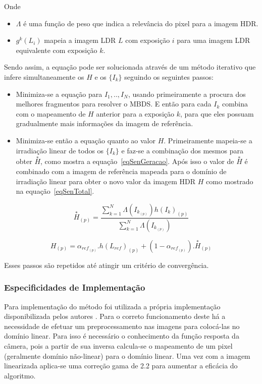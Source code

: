Onde

\begin{itemize}
	\item $\Lambda$ é uma função de peso que indica a relevância do pixel para a imagem HDR.
	\item $g^k(L_i)$ mapeia a imagem LDR $L$ com exposição $i$ para uma imagem LDR equivalente com exposição $k$.
\end{itemize}

Sendo assim, a equação pode ser solucionada através de um método iterativo que infere simultaneamente os $H$ e os $\{I_k\}$ seguindo os seguintes passos:

\begin{itemize}
	\item Minimiza-se a equação para $I_1,..,I_N$, usando primeiramente a procura dos melhores fragmentos para resolver o MBDS. E então para cada $I_k$ combina com o mapeamento de $H$ anterior para a exposição $k$, para que eles possuam gradualmente mais informações da imagem de referência.
	\item Minimiza-se então a equação quanto ao valor $H$. Primeiramente mapeia-se a irradiação linear de todos os $\{I_k\}$ e faz-se a combinação dos mesmos para obter $\overset{*}{H}$, como mostra a equação~\ref{eqSenGeracao}. Após isso o valor de $\overset{*}{H}$ é combinado com a imagem de referência mapeada para o domínio de irradiação linear para obter o novo valor da imagem HDR $H$ como mostrado na equação~\ref{eqSenTotal}.
\end{itemize}

\begin{equation} \label{eqSenGeracao}
	\overset{*}{H}_{(p)} = \frac{\sum\limits_{k = 1}^N{\Lambda(I_{k_{(p)}})h(I_k)_{(p)}}}{\sum\limits_{k = 1}^N{\Lambda(I_{k_{(p)}})}}
\end{equation}

\begin{equation} \label{eqSenTotal}
	H_{(p)} = \alpha_{ref_{(p)}}.h(L_{ref})_{(p)} + (1-\alpha_{ref_{(p)}}).\overset{*}{H}_{(p)}
\end{equation}

Esses passos são repetidos até atingir um critério de convergência.

\subsubsection{Especificidades de Implementação} \label{MetodoSenImplementacao}

Para implementação do método foi utilizada a própria implementação disponibilizada pelos autores \cite{hdrMovimento}. Para o correto funcionamento deste há a necessidade de efetuar um preprocessamento nas imagens para colocá-las no domínio linear. Para isso é necessário o conhecimento da função resposta da câmera, pois a partir de sua inversa calcula-se o mapeamento de um pixel (geralmente domínio não-linear) para o domínio linear. Uma vez com a imagem linearizada aplica-se uma correção gama de 2.2 para aumentar a eficácia do algoritmo.

